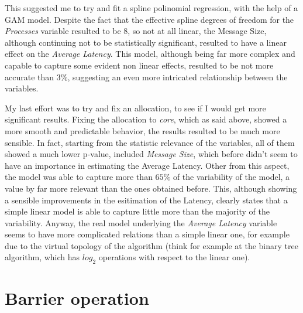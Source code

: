 \documentclass{article}
\begin{document}
	\begin{center}
	
	\end{center}
	
	This suggested me to try and fit a spline polinomial regression, with the help of a GAM model. Despite the fact that the effective spline degrees of freedom for the \textit{Processes} variable resulted to be 8, so not at all linear, the Message Size, although continuing not to be statistically significant, resulted to have a linear effect on the \textit{Average Latency}.
	This model, although being far more complex and capable to capture some evident non linear  effects, resulted to be not more accurate than $3\%$, suggesting an even more intricated relationship between the variables.
	
	
	
	My last effort was to try and fix an allocation, to see if I would get more significant results.
	Fixing the allocation to \textit{core}, which as said above, showed a more smooth and predictable behavior, the results resulted to be much more sensible.
	In fact, starting from the statistic relevance of the variables, all of them showed a much lower p-value, included \textit{Message Size}, which before didn't seem to have an importance in estimating the Average Latency.
	Other from this aspect, the model was able to capture more than $65\%$ of the variability of the model, a value by far more relevant than the ones obtained before. This, although showing a sensible improvements in the esitimation of the Latency, clearly states that a simple linear model is able to capture little more than the majority of the variability. Anyway, the real model underlying the \textit{Average Latency} variable seems to have more complicated relations than a simple linear one, for example due to the virtual topology of the algorithm (think for example at the binary tree algorithm, which has $log_2$ operations with respect to the linear one).
	
	\begin{center}
		
	\end{center}

	
	
	\section{Barrier operation}
	
\end{document}
